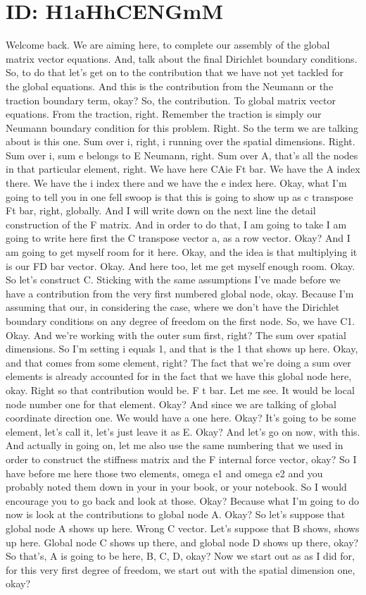 \documentclass[10pt]{article}
\begin{document}
\section*{ID: H1aHhCENGmM}
Welcome back. We are aiming here, to complete our assembly of the global matrix vector equations. And, talk about the final Dirichlet boundary conditions. So, to do that let's get on to the contribution that we have not yet tackled for the global equations. And this is the contribution from the Neumann or the traction boundary term, okay? So, the contribution. To global matrix vector equations. From the traction, right. Remember the traction is simply our Neumann boundary condition for this problem. Right. So the term we are talking about is this one. Sum over i, right, i running over the spatial dimensions. Right. Sum over i, sum e belongs to E Neumann, right. Sum over A, that's all the nodes in that particular element, right. We have here CAie Ft bar. We have the A index there. We have the i index there and we have the e index here. Okay, what I'm going to tell you in one fell swoop is that this is going to show up as c transpose Ft bar, right, globally. And I will write down on the next line the detail construction of the F matrix. And in order to do that, I am going to take I am going to write here first the C transpose vector a, as a row vector. Okay? And I am going to get myself room for it here. Okay, and the idea is that multiplying it is our FD bar vector. Okay. And here too, let me get myself enough room. Okay. So let's construct C. Sticking with the same assumptions I've made before we have a contribution from the very first numbered global node, okay. Because I'm assuming that our, in considering the case, where we don't have the Dirichlet boundary conditions on any degree of freedom on the first node. So, we have C1. Okay. And we're working with the outer sum first, right? The sum over spatial dimensions. So I'm setting i equals 1, and that is the 1 that shows up here. Okay, and that comes from some element, right? The fact that we're doing a sum over elements is already accounted for in the fact that we have this global node here, okay. Right so that contribution would be. F t bar. Let me see. It would be local node number one for that element. Okay? And since we are talking of global coordinate direction one. We would have a one here. Okay? It's going to be some element, let's call it, let's just leave it as E. Okay? And let's go on now, with this. And actually in going on, let me also use the same numbering that we used in order to construct the stiffness matrix and the F internal force vector, okay? So I have before me here those two elements, omega e1 and omega e2 and you probably noted them down in your in your book, or your notebook. So I would encourage you to go back and look at those. Okay? Because what I'm going to do now is look at the contributions to global node A. Okay? So let's suppose that global node A shows up here. Wrong C vector. Let's suppose that B shows, shows up here. Global node C shows up there, and global node D shows up there, okay? So that's, A is going to be here, B, C, D, okay? Now we start out as as I did for, for this very first degree of freedom, we start out with the spatial dimension one, okay? 
\end{document}
